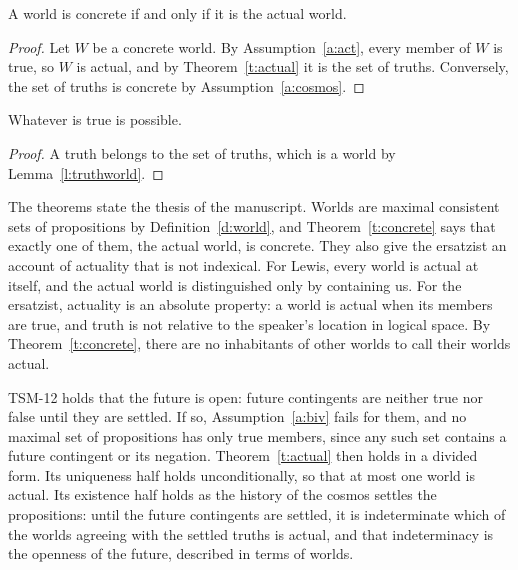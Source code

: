 \documentclass{situationist-preprint}
\begin{document}
\begin{theorem}\label{t:concrete}
A world is concrete if and only if it is the actual world.
\end{theorem}

\begin{proof}
Let $W$ be a concrete world. By Assumption~\ref{a:act}, every member of $W$ is true, so $W$ is actual, and by Theorem~\ref{t:actual} it is the set of truths. Conversely, the set of truths is concrete by Assumption~\ref{a:cosmos}.
\end{proof}

\begin{corollary}\label{c:poss}
Whatever is true is possible.
\end{corollary}

\begin{proof}
A truth belongs to the set of truths, which is a world by Lemma~\ref{l:truthworld}.
\end{proof}

The theorems state the thesis of the manuscript. Worlds are maximal consistent sets of propositions by Definition~\ref{d:world}, and Theorem~\ref{t:concrete} says that exactly one of them, the actual world, is concrete. They also give the ersatzist an account of actuality that is not indexical. For Lewis, every world is actual at itself, and the actual world is distinguished only by containing us. For the ersatzist, actuality is an absolute property: a world is actual when its members are true, and truth is not relative to the speaker's location in logical space. By Theorem~\ref{t:concrete}, there are no inhabitants of other worlds to call their worlds actual.

\begin{remark}\label{r:open}
TSM-12 holds that the future is open: future contingents are neither true nor false until they are settled. If so, Assumption~\ref{a:biv} fails for them, and no maximal set of propositions has only true members, since any such set contains a future contingent or its negation. Theorem~\ref{t:actual} then holds in a divided form. Its uniqueness half holds unconditionally, so that at most one world is actual. Its existence half holds as the history of the cosmos settles the propositions: until the future contingents are settled, it is indeterminate which of the worlds agreeing with the settled truths is actual, and that indeterminacy is the openness of the future, described in terms of worlds.
\end{remark}
\end{document}
